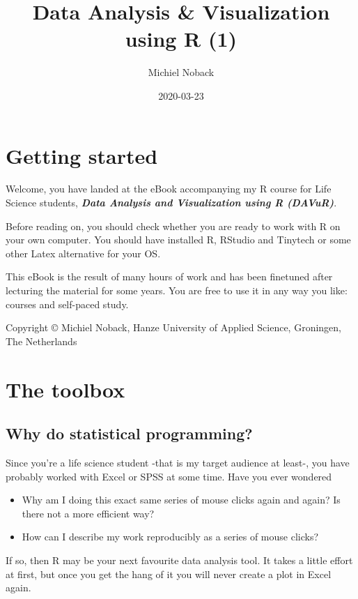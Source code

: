 \documentclass[]{book}
\title{Data Analysis \& Visualization using R (1)}
\author{Michiel Noback}
\date{2020-03-23}
\providecommand{\tightlist}{%
  \setlength{\itemsep}{0pt}\setlength{\parskip}{0pt}}
\begin{document}
\maketitle

{
\setcounter{tocdepth}{1}
\tableofcontents
}
\hypertarget{getting-started}{%
\chapter{Getting started}\label{getting-started}}

Welcome, you have landed at the eBook accompanying my R course for Life Science students, \textbf{\emph{Data Analysis and Visualization using R (DAVuR)}}.

Before reading on, you should check whether you are ready to work with R on your own computer.
You should have installed R, RStudio and Tinytech or some other Latex alternative for your OS.

This eBook is the result of many hours of work and has been finetuned after lecturing the material for some years.
You are free to use it in any way you like: courses and self-paced study.

Copyright © Michiel Noback, Hanze University of Applied Science, Groningen, The Netherlands

\hypertarget{toolbox}{%
\chapter{The toolbox}\label{toolbox}}

\hypertarget{why-do-statistical-programming}{%
\section{Why do statistical programming?}\label{why-do-statistical-programming}}

Since you're a life science student -that is my target audience at least-, you have probably worked with Excel or SPSS at some time. Have you ever wondered

\begin{itemize}
\tightlist
\item
  Why am I doing this exact same series of mouse clicks again and again? Is there not a more efficient way?
\item
  How can I describe my work reproducibly as a series of mouse clicks?
\end{itemize}

If so, then R may be your next favourite data analysis tool.
It takes a little effort at first, but once you get the hang of it you will never create a plot in Excel again.
\end{document}
